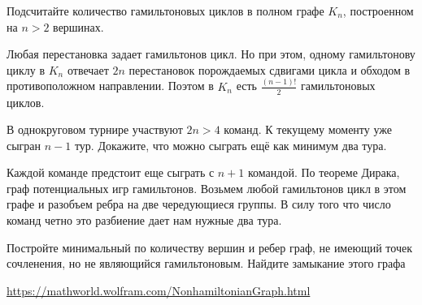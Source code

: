 \documentclass[a4paper,12pt,twoside]{article}
\begin{document}
\begin{?}
    Подсчитайте количество гамильтоновых циклов в полном графе $K_n$, построенном на $n > 2$ вершинах.
\end{?}
\begin{solution}{}
    Любая перестановка задает гамильтонов цикл. Но при этом, одному гамильтонову циклу в \(K_n\) отвечает \(2n\) перестановок порождаемых сдвигами цикла и обходом в противоположном направлении. Поэтом в \(K_n\) есть \(\frac{(n-1)!}{2}\) гамильтоновых циклов.
\end{solution}
\begin{?}
    В однокруговом турнире участвуют $2n > 4$ команд. К текущему моменту уже сыгран $n - 1$ тур. Докажите, что можно сыграть ещё как минимум два тура.
\end{?}
\begin{solution}{}
    Каждой команде предстоит еще сыграть с \(n+1\) командой. По теореме Дирака, граф потенциальных игр гамильтонов. Возьмем любой гамильтонов цикл в этом графе и разобъем ребра на две чередующиеся группы. В силу того что число команд четно это разбиение дает нам нужные два тура.
\end{solution}
\begin{?}
    Постройте минимальный по количеству вершин и ребер граф, не имеющий точек сочленения, но не являющийся гамильтоновым. Найдите замыкание этого графа
\end{?}
\begin{solution}{}
    \url{https://mathworld.wolfram.com/NonhamiltonianGraph.html}
\end{solution}
\end{document}
